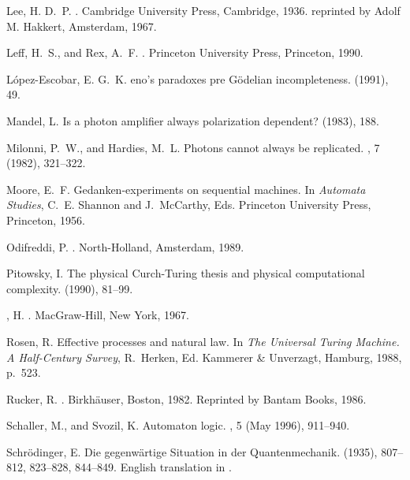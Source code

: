 \begin{thebibliography}{10}
{\sc Lee, H. D.~P.}
.
\newblock Cambridge University Press, Cambridge, 1936.
\newblock reprinted by Adolf M. Hakkert, Amsterdam, 1967.

{\sc Leff, H.~S., and Rex, A.~F.}
.
\newblock Princeton University Press, Princeton, 1990.

{\sc L{\'{o}}pez-Escobar, E. G.~K.}
eno's paradoxes pre {G}{\"{o}}delian incompleteness.
 (1991), 49.

{\sc Mandel, L.}
\newblock Is a photon amplifier always polarization dependent?
 (1983), 188.

{\sc Milonni, P.~W., and Hardies, M.~L.}
\newblock Photons cannot always be replicated.
, 7 (1982), 321--322.

{\sc Moore, E.~F.}
\newblock Gedanken-experiments on sequential machines.
\newblock In {\em Automata Studies}, C.~E. Shannon and J.~McCarthy, Eds.
  Princeton University Press, Princeton, 1956.

{\sc Odifreddi, P.}
.
\newblock North-Holland, Amsterdam, 1989.

{\sc Pitowsky, I.}
\newblock The physical {C}urch-{T}uring thesis and physical computational
  complexity.
 (1990), 81--99.

{, H.}
.
\newblock MacGraw-Hill, New York, 1967.

{\sc Rosen, R.}
\newblock Effective processes and natural law.
\newblock In {\em The Universal Turing Machine. A Half-Century Survey},
  R.~Herken, Ed. Kammerer \& Unverzagt, Hamburg, 1988, p.~523.

{\sc Rucker, R.}
.
\newblock Birkh{\"{a}}user, Boston, 1982.
\newblock Reprinted by Bantam Books, 1986.

{\sc Schaller, M., and Svozil, K.}
\newblock Automaton logic.
, 5 (May 1996),
  911--940.

{\sc Schr{\"{o}}dinger, E.}
\newblock Die gegenw{\"{a}}rtige {S}ituation in der {Q}uantenmechanik.
 (1935), 807--812, 823--828, 844--849.
\newblock English translation in \cite[pp. 152-167]{wheeler-Zurek:83}.


\end{thebibliography}
